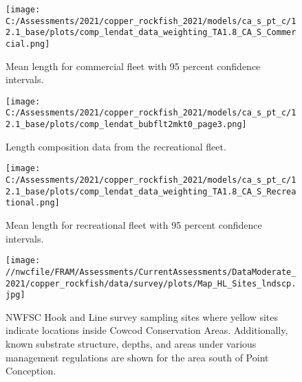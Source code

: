 \documentclass[11pt,
  english,
  a4paper,
]{article}
\begin{document}
\tagmcend\tagstructend


\begin{figure}
\centering
\texttt{[image: C:/Assessments/2021/copper\_rockfish\_2021/models/ca\_s\_pt\_c/12.1\_base/plots/comp\_lendat\_data\_weighting\_TA1.8\_CA\_S\_Commercial.png]}
\caption{Mean length for commercial fleet with 95 percent confidence intervals.\label{fig:mean-com-len-data}}
\end{figure}

\tagmcend\tagstructend


\begin{figure}
\centering
\texttt{[image: C:/Assessments/2021/copper\_rockfish\_2021/models/ca\_s\_pt\_c/12.1\_base/plots/comp\_lendat\_bubflt2mkt0\_page3.png]}
\caption{Length composition data from the recreational fleet.\label{fig:rec-len-data}}
\end{figure}

\tagmcend\tagstructend


\begin{figure}
\centering
\texttt{[image: C:/Assessments/2021/copper\_rockfish\_2021/models/ca\_s\_pt\_c/12.1\_base/plots/comp\_lendat\_data\_weighting\_TA1.8\_CA\_S\_Recreational.png]}
\caption{Mean length for recreational fleet with 95 percent confidence intervals.\label{fig:mean-rec-len-data}}
\end{figure}

\tagmcend\tagstructend


\begin{figure}
\centering
\texttt{[image: //nwcfile/FRAM/Assessments/CurrentAssessments/DataModerate\_2021/copper\_rockfish/data/survey/plots/Map\_HL\_Sites\_lndscp.jpg]}
\caption{NWFSC Hook and Line survey sampling sites where yellow sites indicate locations inside Cowcod Conservation Areas. Additionally, known substrate structure, depths, and areas under various management regulations are shown for the area south of Point Conception.\label{fig:hkl-sites}}
\end{figure}
\end{document}
